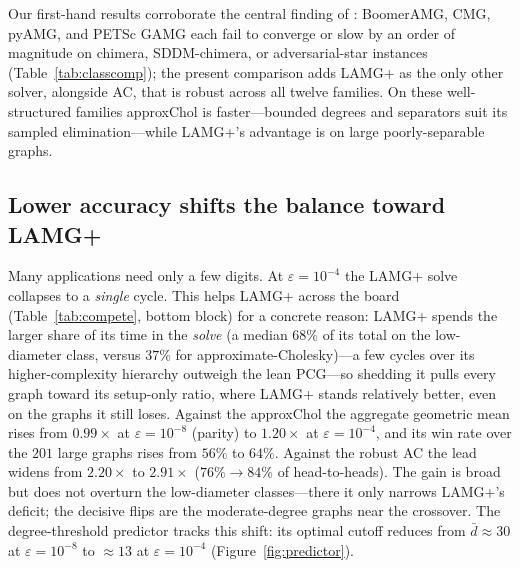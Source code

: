 \documentclass[leqno,letterpaper]{etna}
\begin{document}
Our first-hand results corroborate the central finding of \cite{gks2023}: BoomerAMG, CMG, pyAMG,
and PETSc GAMG each fail to converge or slow by an order of magnitude on chimera, SDDM-chimera, or
adversarial-star instances (Table~\ref{tab:classcomp}); the present comparison adds LAMG+ as the
only other solver, alongside AC, that is robust across all twelve families. On these well-structured families approxChol is faster---bounded degrees and separators
suit its sampled elimination---while LAMG+'s advantage is on large poorly-separable graphs.

\subsection{Lower accuracy shifts the balance toward LAMG+}\label{sec:tol4}
Many applications need only a few digits. At $\varepsilon=10^{-4}$ the LAMG+ solve collapses
to a \emph{single} cycle. This helps LAMG+ across the board
(Table~\ref{tab:compete}, bottom block) for a concrete reason: LAMG+ spends the larger share of its
time in the \emph{solve} (a median $68\%$ of its total on the low-diameter class, versus $37\%$ for
approximate-Cholesky)---a few cycles over its higher-complexity hierarchy outweigh the lean
PCG---so shedding it pulls every graph toward its setup-only ratio,
where LAMG+ stands relatively better, even on the graphs it still loses. Against the approxChol the aggregate geometric mean rises from
$0.99\times$ at $\varepsilon=10^{-8}$ (parity) to $1.20\times$ at $\varepsilon=10^{-4}$, and its win rate
over the $201$ large graphs rises from $56\%$ to $64\%$. Against the robust AC the lead widens from
$2.20\times$ to $2.91\times$ ($76\%\!\to\!84\%$ of head-to-heads). The gain is broad but does not
overturn the low-diameter classes---there it only narrows LAMG+'s deficit; the decisive flips are the
moderate-degree graphs near the crossover. The degree-threshold predictor tracks this shift: its optimal cutoff reduces from $\bar d\approx30$ at $\varepsilon=10^{-8}$ to $\approx13$ at $\varepsilon=10^{-4}$
(Figure~\ref{fig:predictor}).
\end{document}
